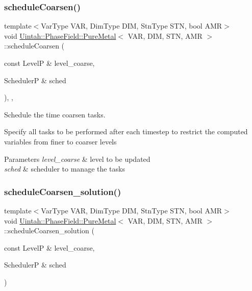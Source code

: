 \subsubsection{\texorpdfstring{schedule\+Coarsen()}{scheduleCoarsen()}}
{\footnotesize\ttfamily template$<$Var\+Type V\+AR, Dim\+Type D\+IM, Stn\+Type S\+TN, bool A\+MR$>$ \\
void \hyperlink{classUintah_1_1PhaseField_1_1PureMetal}{Uintah\+::\+Phase\+Field\+::\+Pure\+Metal}$<$ V\+AR, D\+IM, S\+TN, A\+MR $>$\+::schedule\+Coarsen (\begin{DoxyParamCaption}\item[{const LevelP \&}]{level\+\_\+coarse,  }\item[{SchedulerP \&}]{sched }\end{DoxyParamCaption})\hspace{0.3cm}{\ttfamily [override]}, {\ttfamily [protected]}, {\ttfamily [virtual]}}



Schedule the time coarsen tasks. 

Specify all tasks to be performed after each timestep to restrict the computed variables from finer to coarser levels


\begin{DoxyParams}{Parameters}
{\em level\+\_\+coarse} & level to be updated \\
\hline
{\em sched} & scheduler to manage the tasks \\
\hline
\end{DoxyParams}
\mbox{\label{classUintah_1_1PhaseField_1_1PureMetal_ace0a1e8ac16c5903a67c2debce869bc3}} 
\subsubsection{\texorpdfstring{schedule\+Coarsen\+\_\+solution()}{scheduleCoarsen\_solution()}}
{\footnotesize\ttfamily template$<$Var\+Type V\+AR, Dim\+Type D\+IM, Stn\+Type S\+TN, bool A\+MR$>$ \\
void \hyperlink{classUintah_1_1PhaseField_1_1PureMetal}{Uintah\+::\+Phase\+Field\+::\+Pure\+Metal}$<$ V\+AR, D\+IM, S\+TN, A\+MR $>$\+::schedule\+Coarsen\+\_\+solution (\begin{DoxyParamCaption}\item[{const LevelP \&}]{level\+\_\+coarse,  }\item[{SchedulerP \&}]{sched }\end{DoxyParamCaption})\hspace{0.3cm}{\ttfamily [protected]}}



